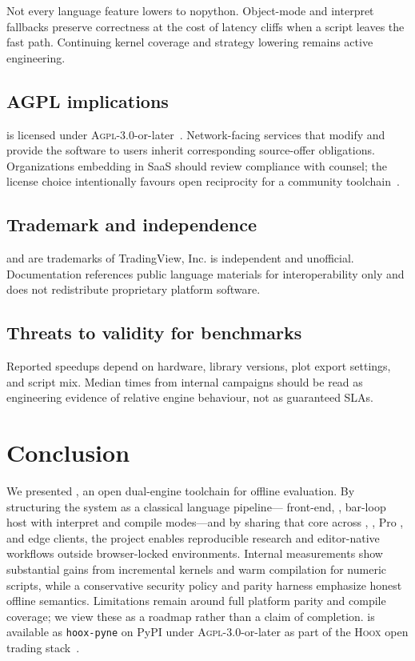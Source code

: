 \documentclass[11pt,a4paper]{article}
\begin{document}
Not every language feature lowers to nopython.
Object-mode and interpret fallbacks preserve correctness at the cost of
latency cliffs when a script leaves the fast path.
Continuing kernel coverage and strategy lowering remains active engineering.

\subsection{AGPL implications}
\label{sec:lim-agpl}

\pyne{} is licensed under \textsc{Agpl}-3.0-or-later~\citep{agpl3}.
Network-facing services that modify and provide the software to users inherit
corresponding source-offer obligations.
Organizations embedding \pyne{} in SaaS should review compliance with counsel;
the license choice intentionally favours open reciprocity for a community
toolchain~\citep{hoox2026}.

\subsection{Trademark and independence}
\label{sec:lim-tm}

\pine{} and \tv{} are trademarks of TradingView, Inc.
\pyne{} is independent and unofficial.
Documentation references public language materials for interoperability only
and does not redistribute proprietary platform software.

\subsection{Threats to validity for benchmarks}
\label{sec:lim-bench}

Reported speedups depend on hardware, library versions, plot export settings,
and script mix.
Median times from internal campaigns should be read as engineering evidence of
relative engine behaviour, not as guaranteed SLAs.

\section{Conclusion}
\label{sec:conclusion}

We presented \pyne{}, an open dual-engine toolchain for offline \pine{}
evaluation.
By structuring the system as a classical language pipeline---\antlr{} front-end,
\asdl{} \ast{}, bar-loop host with interpret and \numba{} compile modes---and
by sharing that core across \cli{}, \lsp{}, Pro \api{}, and edge clients, the
project enables reproducible research and editor-native workflows outside
browser-locked environments.
Internal measurements show substantial gains from incremental kernels and warm
compilation for numeric scripts, while a conservative security policy and
parity harness emphasize honest offline semantics.
Limitations remain around full platform parity and compile coverage; we view
these as a roadmap rather than a claim of completion.
\pyne{} is available as \texttt{hoox-pyne} on PyPI under
\textsc{Agpl}-3.0-or-later as part of the \textsc{Hoox} open trading
stack~\citep{pynescript2026,hoox2026}.
\end{document}
